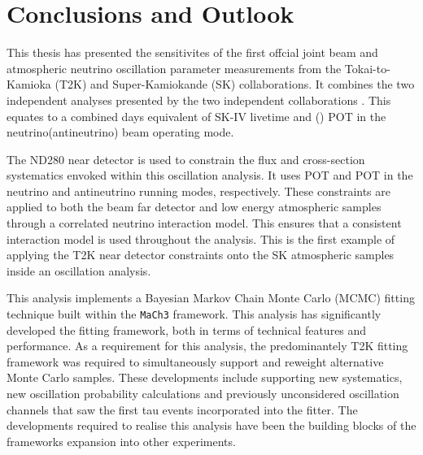 \chapter{Conclusions and Outlook}

This thesis has presented the sensitivites of the first offcial joint beam and atmospheric neutrino oscillation parameter measurements from the Tokai-to-Kamioka (T2K) and Super-Kamiokande (SK) collaborations. It combines the two independent analyses presented by the two independent collaborations . This equates to a combined  days equivalent of SK-IV livetime and () POT in the neutrino(antineutrino) beam operating mode.

The ND280 near detector is used to constrain the flux and cross-section systematics envoked within this oscillation analysis. It uses POT and POT in the neutrino and antineutrino running modes, respectively. These constraints are applied to both the beam far detector and low energy atmospheric samples through a correlated neutrino interaction model. This ensures that a consistent interaction model is used throughout the analysis. This is the first example of applying the T2K near detector constraints onto the SK atmospheric samples inside an oscillation analysis. 

This analysis implements a Bayesian Markov Chain Monte Carlo (MCMC) fitting technique built within the \texttt{MaCh3} framework. This analysis has significantly developed the fitting framework, both in terms of technical features and performance. As a requirement for this analysis, the predominantely T2K fitting framework was required to simultaneously support and reweight alternative Monte Carlo samples. These developments include supporting new systematics, new oscillation probability calculations and previously unconsidered oscillation channels that saw the first tau events incorporated into the fitter. The developments required to realise this analysis have been the building blocks of the frameworks expansion into other experiments. 

